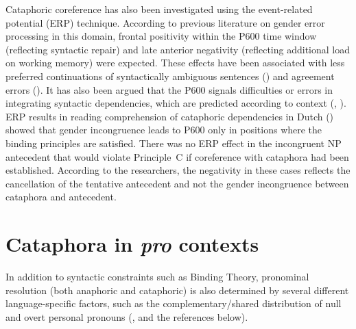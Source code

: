 \documentclass[output=paper,colorlinks,citecolor=brown]{langscibook}
\begin{document}
\ea \label{ste-pav:ex:she-was-taking} 
\z\z

\noindent Cataphoric coreference has also been investigated using the event-related potential (ERP) technique. According to previous literature on gender error processing in this domain, frontal positivity within the P600 time window (reflecting syntactic repair) and late anterior negativity (reflecting additional load on working memory) were expected. These effects have been associated with less preferred continuations of syntactically ambiguous sentences (\citealt{osterhoutHolcomb1992, barber2004, gouvea2010}) and agreement errors (\citealt{hagoort1999, osterhoutMobley1995}). It has also been argued that the P600 signals difficulties or errors in integrating syntactic dependencies, which are predicted according to context (\citealt{federmeier2007, DeLong2011}, \citeyear{DeLong2014, vanPetten2006}). ERP results in reading comprehension of cataphoric dependencies in Dutch (\citealt{pablosCheng2015, pablosCheng2018}) showed that gender incongruence leads to P600 only in positions where the binding principles are satisfied. There was no ERP effect in the incongruent NP antecedent that would violate Principle~C if coreference with cataphora had been established. According to the researchers, the negativity in these cases reflects the cancellation of the tentative antecedent and not the gender incongruence between cataphora and antecedent.

\section{Cataphora in \textit{pro} contexts}\label{ste-pav:sec:cataphora-pro-contexts}

In addition to syntactic constraints such as Binding Theory, pronominal resolution (both anaphoric and cataphoric) is also determined by several different language-specific factors, such as the complementary/shared distribution of null and overt personal pronouns (\citealt{boschEtal2003, wilsonKeller2009}, and the references below). 
\end{document}
